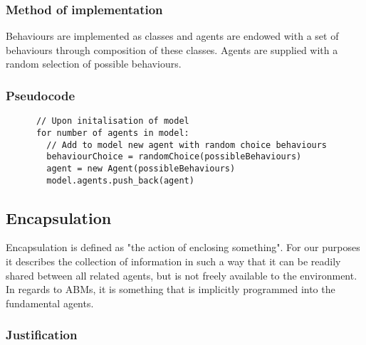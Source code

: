 \documentclass{article}
\begin{document}
    \subsubsection{Method of implementation}
      
      Behaviours are implemented as classes and agents are endowed with a set of behaviours through composition of these classes. Agents are supplied with a random selection of possible behaviours.

    \subsubsection{Pseudocode}
      
      \begin{verbatim}
      // Upon initalisation of model
      for number of agents in model:
        // Add to model new agent with random choice behaviours
        behaviourChoice = randomChoice(possibleBehaviours) 
        agent = new Agent(possibleBehaviours)
        model.agents.push_back(agent)
      \end{verbatim}


  \subsection{Encapsulation}
  \label{sec: encap}
      
    Encapsulation is defined as "the action of enclosing something". For our purposes it describes the collection of information in such a way that it can be readily shared between all related agents, but is not freely available to the environment. In regards to ABMs, it is something that is implicitly programmed into the fundamental agents.

    \subsubsection{Justification}

\end{document}
